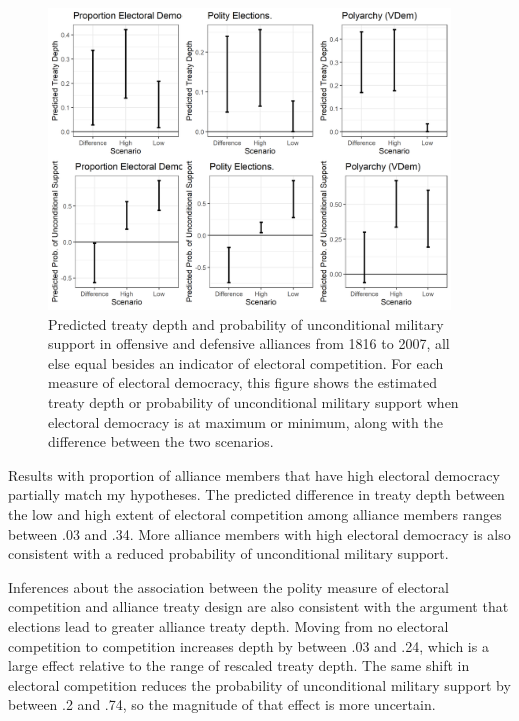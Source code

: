 \documentclass[12pt]{article}
\begin{document}
\begin{figure}[hbtp]
\centering
\includegraphics[width=0.95\textwidth]{../figures/results-other-democ.png}
\caption{Predicted treaty depth and probability of unconditional military support in offensive and defensive alliances from 1816 to 2007, all else equal besides an indicator of electoral competition. For each measure of electoral democracy, this figure shows the estimated treaty depth or probability of unconditional military support when electoral democracy is at maximum or minimum, along with the difference between the two scenarios.}
\label{fig:results-other-democ}
\end{figure}


Results with proportion of alliance members that have high electoral democracy partially match my hypotheses.  
The predicted difference in treaty depth between the low and high extent of electoral competition among alliance members ranges between .03 and .34.
More alliance members with high electoral democracy is also consistent with a reduced probability of unconditional military support. 


Inferences about the association between the polity measure of electoral competition and alliance treaty design are also consistent with the argument that elections lead to greater alliance treaty depth.
Moving from no electoral competition to competition increases depth by between .03 and .24, which is a large effect relative to the range of rescaled treaty depth. 
The same shift in electoral competition reduces the probability of unconditional military support by between .2 and .74, so the magnitude of that effect is more uncertain.  
\end{document}
